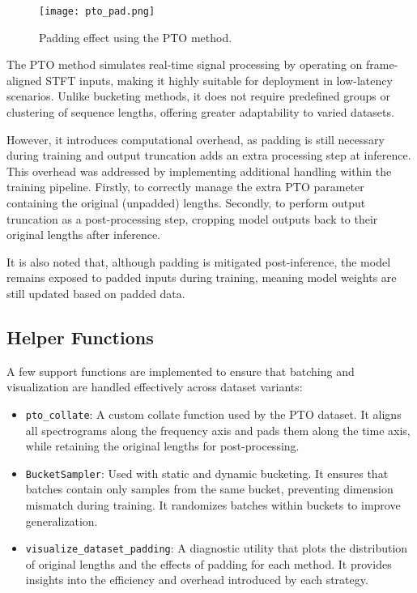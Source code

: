 \begin{figure}[H]
    \centering
    \texttt{[image: pto\_pad.png]}
    \caption{Padding effect using the PTO method.}
    \label{fig:pto_pad}
\end{figure}

The PTO method simulates real-time signal processing by operating on frame-aligned STFT inputs, making it highly suitable for deployment in low-latency scenarios. Unlike bucketing methods, it does not require predefined groups or clustering of sequence lengths, offering greater adaptability to varied datasets.

However, it introduces computational overhead, as padding is still necessary during training and output truncation adds an extra processing step at inference. This overhead was addressed by implementing additional handling within the training pipeline. Firstly, to correctly manage the extra PTO parameter containing the original (unpadded) lengths. Secondly, to perform output truncation as a post-processing step, cropping model outputs back to their original lengths after inference.

It is also noted that, although padding is mitigated post-inference, the model remains exposed to padded inputs during training, meaning model weights are still updated based on padded data. 

\subsection{Helper Functions}
\label{subsec:helper_functions}

A few support functions are implemented to ensure that batching and visualization are handled effectively across dataset variants:

\begin{itemize}
    \item \texttt{pto\_collate}: A custom collate function used by the PTO dataset. It aligns all spectrograms along the frequency axis and pads them along the time axis, while retaining the original lengths for post-processing.
    \item \texttt{BucketSampler}: Used with static and dynamic bucketing. It ensures that batches contain only samples from the same bucket, preventing dimension mismatch during training. It randomizes batches within buckets to improve generalization.
    \item \texttt{visualize\_dataset\_padding}: A diagnostic utility that plots the distribution of original lengths and the effects of padding for each method. It provides insights into the efficiency and overhead introduced by each strategy.
\end{itemize}


